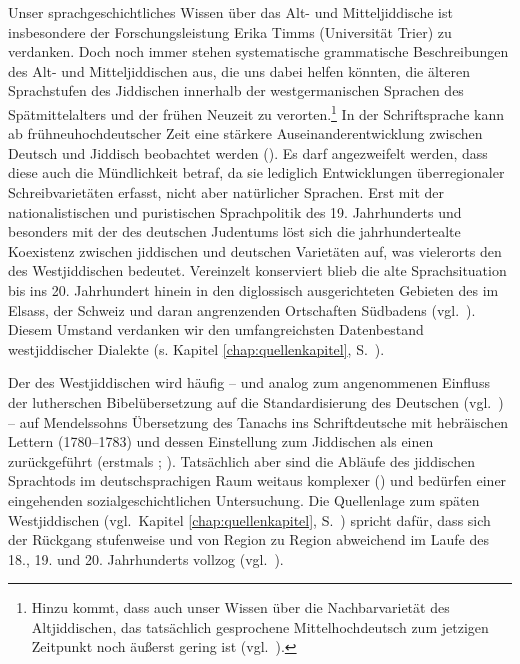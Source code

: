 Unser sprachgeschichtliches Wissen über das Alt- und Mitteljiddische ist insbesondere der Forschungsleistung Erika Timms (Universität Trier) zu verdanken. Doch noch immer stehen systematische grammatische Beschreibungen des Alt- und Mitteljiddischen aus, die uns dabei helfen könnten, die älteren Sprachstufen des Jiddischen innerhalb der westgermanischen Sprachen des Spätmittelalters und der frühen Neuzeit zu verorten.\footnote{Hinzu kommt, dass auch unser Wissen über die Nachbarvarietät des Altjiddischen, das tatsächlich gesprochene Mittelhochdeutsch zum jetzigen Zeitpunkt noch äußerst gering ist (vgl.\, \citealt{Wegera2000}).} In der Schriftsprache kann ab frühneuhochdeutscher Zeit eine stärkere Auseinanderentwicklung zwischen Deutsch und Jiddisch beobachtet werden (\citealt{Timm1987b,Timm1991,Timm2005}). Es darf angezweifelt werden, dass diese auch die Mündlichkeit betraf, da sie lediglich Entwicklungen überregionaler Schreibvarietäten erfasst, nicht aber natürlicher Sprachen. Erst mit der nationalistischen und puristischen Sprachpolitik des 19. Jahrhunderts und besonders mit der  des deutschen Judentums löst sich die jahrhundertealte Koexistenz zwischen jiddischen und deutschen Varietäten auf, was vielerorts den  des Westjiddischen bedeutet. Vereinzelt konserviert blieb die alte Sprachsituation bis ins 20. Jahrhundert hinein in den diglossisch ausgerichteten Gebieten des \hai{{\SWJ}} im Elsass, der Schweiz und daran angrenzenden Ortschaften Südbadens (vgl.\, \citealt[69]{Mieses1915}). Diesem Umstand verdanken wir den umfangreichsten Datenbestand westjiddischer Dialekte (s. Kapitel \ref{chap:quellenkapitel}, S.\, \pageref{chap:quellenkapitel}). 

Der  des Westjiddischen wird häufig – und analog zum angenommenen Einfluss der lutherschen Bibelübersetzung auf die Standardisierung des Deutschen (vgl.\, \citealt{Besch1999}) – auf Mendelssohns Übersetzung des Tanachs ins Schriftdeutsche mit hebräischen Lettern (1780–1783) und dessen Einstellung zum Jiddischen als einen  zurückgeführt (erstmals \citealt[159]{PiererLoebe1860}; \citealt[113–114]{Mieses1915}). Tatsächlich aber sind die Abläufe des jiddischen Sprachtods im deutschsprachigen Raum weitaus komplexer (\citealt[20–32]{Weinreich1923}) und bedürfen einer eingehenden sozialgeschichtlichen Untersuchung. Die Quellenlage zum späten Westjiddischen (vgl.\, Kapitel \ref{chap:quellenkapitel}, S.\, \pageref{chap:quellenkapitel}) spricht dafür, dass sich der Rückgang stufenweise und von Region zu Region abweichend im Laufe des 18., 19. und 20. Jahrhunderts vollzog (vgl.\, \citealt{GuggenheimGruenberg1973,Roemer2002}). 


